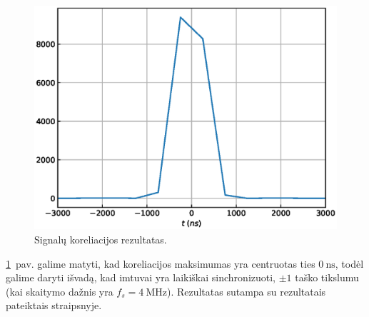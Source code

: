 \documentclass[main.tex]{subfiles}
\begin{document}
\begin{figure}[h]
    \begin{centering}
    \includegraphics[scale=1.0]{drawings/time_sync}
    \par\end{centering}
    \protect\caption{\label{fig:time_sync_result}Signalų koreliacijos rezultatas.}
\end{figure}

\ref{fig:time_sync_result}~pav. galime matyti, kad koreliacijos maksimumas yra centruotas
ties $0\ \mathrm{ns}$, todėl galime daryti išvadą, kad imtuvai yra
laikiškai sinchronizuoti, $\pm 1$ taško tikslumu (kai skaitymo dažnis yra $f_s=4\ \mathrm{MHz}$).
Rezultatas sutampa su rezultatais pateiktais \cite{hackrf_sync} straipsnyje.
\end{document}
